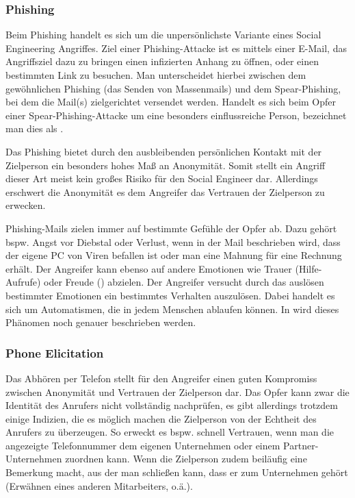 \subsubsection{Phishing}
Beim Phishing handelt es sich um die unpersönlichste Variante eines Social Engineering Angriffes.
Ziel einer Phishing-Attacke ist es mittels einer E-Mail, das Angriffsziel dazu zu bringen einen infizierten Anhang zu öffnen, oder einen bestimmten Link zu besuchen. Man unterscheidet hierbei zwischen dem gewöhnlichen Phishing (das Senden von Massenmails) und dem Spear-Phishing, bei dem die Mail(s) zielgerichtet versendet werden. Handelt es sich beim Opfer einer Spear-Phishing-Attacke um eine besonders einflussreiche Person, bezeichnet man dies als . \cite{hadnagy}

Das Phishing bietet durch den ausbleibenden persönlichen Kontakt mit der Zielperson ein besonders hohes Maß an Anonymität. Somit stellt ein Angriff dieser Art meist kein großes Risiko für den Social Engineer dar.
Allerdings erschwert die Anonymität es dem Angreifer das Vertrauen der Zielperson zu erwecken.
\cite{hacking-the-human}

Phishing-Mails zielen immer auf bestimmte Gefühle der Opfer ab. Dazu gehört bspw. Angst vor Diebstal oder Verlust, wenn in der Mail beschrieben wird, dass der eigene PC von Viren befallen ist oder man eine Mahnung für eine Rechnung erhält.
Der Angreifer kann ebenso auf andere Emotionen wie Trauer (Hilfe-Aufrufe) oder Freude () abzielen.
Der Angreifer versucht durch das auslösen bestimmter Emotionen ein bestimmtes Verhalten auszulösen. Dabei handelt es sich um Automatismen, die in jedem Menschen ablaufen können. In  wird dieses Phänomen noch genauer beschrieben werden. \cite{hadnagy}


\subsubsection{Phone Elicitation}\label{sec:phone-elicitation}
Das Abhören per Telefon stellt für den Angreifer einen guten Kompromiss zwischen Anonymität und Vertrauen der Zielperson dar. Das Opfer kann zwar die Identität des Anrufers nicht vollständig nachprüfen, es gibt allerdings trotzdem einige Indizien, die es möglich machen die Zielperson von der Echtheit des Anrufers zu überzeugen. So erweckt es bspw. schnell Vertrauen, wenn man die angezeigte Telefonnummer dem eigenen Unternehmen oder einem Partner-Unternehmen zuordnen kann. Wenn die Zielperson zudem beiläufig eine Bemerkung macht, aus der man schließen kann, dass er zum Unternehmen gehört (Erwähnen eines anderen Mitarbeiters, o.ä.).

